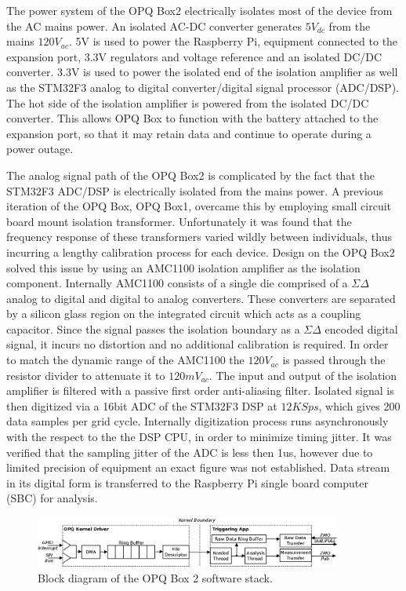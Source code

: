 The power system of the OPQ Box2 electrically isolates most of the device from the AC mains power.
An isolated AC-DC converter generates $5V_{dc}$ from the mains $120V_{ac}$.
5V is used to power the Raspberry Pi, equipment connected to the expansion port, 3.3V regulators and voltage reference and an isolated DC/DC converter.
3.3V is used to power the isolated end of the isolation amplifier as well as the STM32F3 analog to digital converter/digital signal processor (ADC/DSP).
The hot side of the isolation amplifier is powered from the isolated DC/DC converter.
This allows OPQ Box to function with the battery attached to the expansion port, so that it may retain data and continue to operate during a power outage.


The analog signal path of the OPQ Box2 is complicated by the fact that the STM32F3 ADC/DSP is electrically isolated from the mains power.
A previous iteration of the OPQ Box, OPQ Box1, overcame this by employing small circuit board mount isolation transformer.
Unfortunately it was found that the frequency response of these transformers varied wildly between individuals, thus incurring a lengthy calibration process for each device.
Design on the OPQ Box2 solved this issue by using an AMC1100 isolation amplifier as the isolation component.
Internally AMC1100 consists of a single die comprised of a $\Sigma\Delta$ analog to digital and digital to analog converters.
These converters are separated by a silicon glass region on the integrated circuit which acts as a coupling capacitor.
Since the signal passes the isolation boundary as a $\Sigma\Delta$ encoded digital signal, it incurs no distortion and no additional calibration is required.
In order to match the dynamic range of the AMC1100 the $120V_{ac}$ is passed through the resistor divider to attenuate it to $120mV_{ac}$.
The input and output of the isolation amplifier is filtered with a passive first order anti-aliasing filter.
Isolated signal is then digitized via a 16bit ADC of the STM32F3 DSP at $12 KSps$, which gives 200 data samples per grid cycle.
Internally digitization process runs asynchronously with the respect to the the DSP CPU, in order to minimize timing jitter.
It was verified that the sampling jitter of the ADC is less then 1us, however due to limited precision of equipment an exact figure was not established.
Data stream in its digital form is transferred to the Raspberry Pi single board computer (SBC) for analysis.

\begin{figure}[h]
  \begin{center}
  \includegraphics[width=0.9\textwidth]{img/opqbox_software.png}
  \end{center}
  \caption{Block diagram of the OPQ Box 2 software stack.}
  \label{fig:opq:3}
\end{figure}

